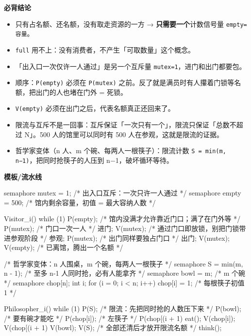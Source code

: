 \documentclass[10pt,a4paper]{ctexart}
\begin{document}


\textbf{必背结论}

\begin{itemize}

\item 只有占名额、还名额，没有取走资源的一方 → \textbf{只需要一个}计数信号量 \texttt{empty=容量}。

\item \texttt{full} 用不上：没有消费者，不产生「可取数量」这个概念。

\item 「出入口一次仅许一人通过」是另一个互斥量 \texttt{mutex=1}，进门和出门都要包。

\item 顺序：\texttt{P(empty)} 必须在 \texttt{P(mutex)} 之前。反了就是满员时有人攥着门锁等名额，把出门的人也堵在门外 = 死锁。

\item \texttt{V(empty)} 必须在出门之后，代表名额真正还回来了。

\item 限流与互斥不是一回事：互斥保证「一次只有一个」，限流只保证「总数不超过 N」。500 人的馆里可以同时有 500 人在参观，这就是限流的证据。

\item 哲学家变体（n 人、m 个碗、每两人一根筷子）：限流计数 \texttt{S = min(m, n−1)}，把同时抢筷子的人压到 n−1，破坏循环等待。

\end{itemize}

\textbf{模板/流水线}

\begin{codebox}
semaphore mutex = 1;        /* 出入口互斥：一次只许一人通过 */
semaphore empty = 500;      /* 馆内剩余容量，初值 = 最大容纳人数 */

Visitor_i() { while (1) {
    P(empty);               /* 馆内没满才允许靠近门口；满了在门外等 */
    P(mutex);               /* 门口一次一人 */
    进门;
    V(mutex);               /* 通过门口即放锁，别把门锁带进参观阶段 */
    参观;
    P(mutex);               /* 出门同样要独占门口 */
    出门;
    V(mutex);
    V(empty);               /* 已离馆，腾出一个名额 */
} }
\end{codebox}

\begin{codebox}
/* 哲学家变体：n 人围桌，m 个碗，每两人一根筷子 */
semaphore S = min(m, n - 1);        /* 至多 n-1 人同时抢，必有人能拿齐 */
semaphore bowl = m;                 /* m 个碗 */
semaphore chop[n];
int i;
for (i = 0; i < n; i++) chop[i] = 1;  /* 每根筷子初值 1 */

Philosopher_i() { while (1) {
    P(S);                           /* 限流：先把同时抢的人数压下来 */
    P(bowl);                        /* 要有碗才能吃 */
    P(chop[i]);                     /* 左筷子 */
    P(chop[(i + 1) %
    eat();
    V(chop[i]); V(chop[(i + 1) %
    V(bowl);
    V(S);                           /* 全部还清后才放开限流名额 */
    think();
} }
\end{codebox}
\end{document}
